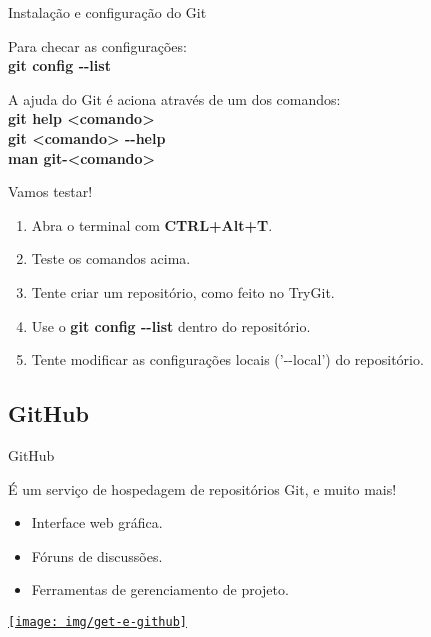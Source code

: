 \documentclass[a4paper]{beamer}
\begin{document}
\begin{frame}{Instalação e configuração do Git}

Para checar as configurações:\\
\textbf{git config -{}-list}
\pause

\vspace{10pt}
A ajuda do Git é aciona através de um dos comandos:\\
\textbf{git help <comando>}\\
\textbf{git <comando> -{}-help}\\
\textbf{man git-<comando>}
\pause

\vspace{10pt}
Vamos testar!
\begin{enumerate}
\item Abra o terminal com \textbf{CTRL+Alt+T}.
\item Teste os comandos acima.
\item Tente criar um repositório, como feito no TryGit.
\item Use o \textbf{git config -{}-list} dentro do repositório.
\item Tente modificar as configurações locais ('-{}-local') do repositório.
\end{enumerate}

\end{frame}

\subsection{GitHub}

\begin{frame}{GitHub}

É um serviço de hospedagem de repositórios Git, e muito mais!

\begin{itemize}
\item Interface web gráfica.
\item Fóruns de discussões.
\item Ferramentas de gerenciamento de projeto.
\end{itemize}

\begin{center}
\href{https://github.com/}{\texttt{[image: img/get-e-github]}}
\end{center}

\end{frame}
\end{document}
